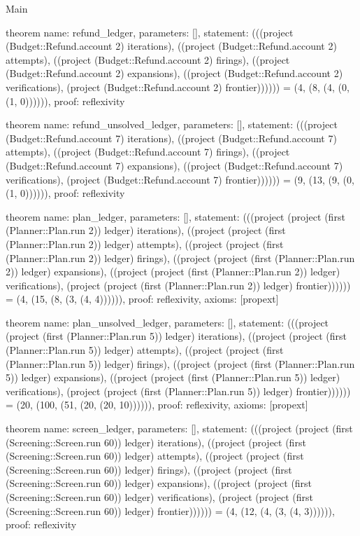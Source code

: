 \begin{lexlean}{Main}
\begin{semanticmodule}
theorem{
  name: refund_ledger,
  parameters: [],
  statement: (((project (Budget::Refund.account 2) iterations), ((project (Budget::Refund.account 2) attempts), ((project (Budget::Refund.account 2) firings), ((project (Budget::Refund.account 2) expansions), ((project (Budget::Refund.account 2) verifications), (project (Budget::Refund.account 2) frontier)))))) = (4, (8, (4, (0, (1, 0)))))),
  proof: reflexivity{}
}

theorem{
  name: refund_unsolved_ledger,
  parameters: [],
  statement: (((project (Budget::Refund.account 7) iterations), ((project (Budget::Refund.account 7) attempts), ((project (Budget::Refund.account 7) firings), ((project (Budget::Refund.account 7) expansions), ((project (Budget::Refund.account 7) verifications), (project (Budget::Refund.account 7) frontier)))))) = (9, (13, (9, (0, (1, 0)))))),
  proof: reflexivity{}
}

theorem{
  name: plan_ledger,
  parameters: [],
  statement: (((project (project (first (Planner::Plan.run 2)) ledger) iterations), ((project (project (first (Planner::Plan.run 2)) ledger) attempts), ((project (project (first (Planner::Plan.run 2)) ledger) firings), ((project (project (first (Planner::Plan.run 2)) ledger) expansions), ((project (project (first (Planner::Plan.run 2)) ledger) verifications), (project (project (first (Planner::Plan.run 2)) ledger) frontier)))))) = (4, (15, (8, (3, (4, 4)))))),
  proof: reflexivity{},
  axioms: [propext]
}

theorem{
  name: plan_unsolved_ledger,
  parameters: [],
  statement: (((project (project (first (Planner::Plan.run 5)) ledger) iterations), ((project (project (first (Planner::Plan.run 5)) ledger) attempts), ((project (project (first (Planner::Plan.run 5)) ledger) firings), ((project (project (first (Planner::Plan.run 5)) ledger) expansions), ((project (project (first (Planner::Plan.run 5)) ledger) verifications), (project (project (first (Planner::Plan.run 5)) ledger) frontier)))))) = (20, (100, (51, (20, (20, 10)))))),
  proof: reflexivity{},
  axioms: [propext]
}

theorem{
  name: screen_ledger,
  parameters: [],
  statement: (((project (project (first (Screening::Screen.run 60)) ledger) iterations), ((project (project (first (Screening::Screen.run 60)) ledger) attempts), ((project (project (first (Screening::Screen.run 60)) ledger) firings), ((project (project (first (Screening::Screen.run 60)) ledger) expansions), ((project (project (first (Screening::Screen.run 60)) ledger) verifications), (project (project (first (Screening::Screen.run 60)) ledger) frontier)))))) = (4, (12, (4, (3, (4, 3)))))),
  proof: reflexivity{}
}


\end{semanticmodule}
\end{lexlean}
